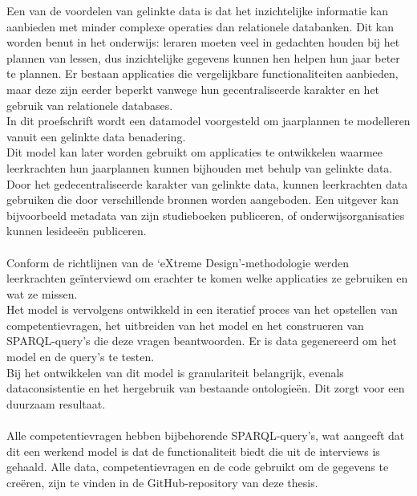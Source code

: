 \noindent Een van de voordelen van gelinkte data is dat het inzichtelijke informatie kan aanbieden met minder complexe operaties dan relationele databanken.
Dit kan worden benut in het onderwijs: leraren moeten veel in gedachten houden bij het plannen van lessen, dus inzichtelijke gegevens kunnen hen helpen hun jaar beter te plannen.
Er bestaan applicaties die vergelijkbare functionaliteiten aanbieden, maar deze zijn eerder beperkt vanwege hun gecentraliseerde karakter en het gebruik van relationele databases.\\
In dit proefschrift wordt een datamodel voorgesteld om jaarplannen te modelleren vanuit een gelinkte data benadering.\\
Dit model kan later worden gebruikt om applicaties te ontwikkelen waarmee leerkrachten hun jaarplannen kunnen bijhouden met behulp van gelinkte data.\\
Door het gedecentraliseerde karakter van gelinkte data, kunnen leerkrachten data gebruiken die door verschillende bronnen worden aangeboden.
Een uitgever kan bijvoorbeeld metadata van zijn studieboeken publiceren, of onderwijsorganisaties kunnen lesideeën publiceren.\\ \\
Conform de richtlijnen van de `eXtreme Design'-methodologie werden leerkrachten geïnterviewd om erachter te komen welke applicaties ze gebruiken en wat ze missen.\\
Het model is vervolgens ontwikkeld in een iteratief proces van het opstellen van competentievragen, het uitbreiden van het model en het construeren van SPARQL-query's die deze vragen beantwoorden.
Er is data gegenereerd om het model en de query's te testen.\\
Bij het ontwikkelen van dit model is granulariteit belangrijk, evenals dataconsistentie en het hergebruik van bestaande ontologieën. Dit zorgt voor een duurzaam resultaat.\\ \\
Alle competentievragen hebben bijbehorende SPARQL-query's, wat aangeeft dat dit een werkend model is dat de functionaliteit biedt die uit de interviews is gehaald.
Alle data, competentievragen en de code gebruikt om de gegevens te creëren, zijn te vinden in de GitHub-repository van deze thesis.